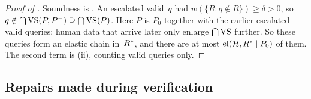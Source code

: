\begin{proof}[Proof of ]
Soundness is . An escalated valid~$q$ had $w(\{R:q\notin R\})\ge\delta>0$, so $q\notin\bigcap\mathrm{VS}(P,P^-)\supseteq\bigcap\mathrm{VS}(P)$. Here $P$ is $P_0$ together with the earlier escalated valid queries; human data that arrive later only enlarge $\bigcap\mathrm{VS}$ further. So these queries form an elastic chain in~$R^{*}$, and there are at most $\mathrm{el}(\mathcal{H},R^{*}\mid P_0)$ of them. The second term is (ii), counting valid queries only.
\end{proof}

\subsection{Repairs made during verification}\label{app:caution:repairs}

